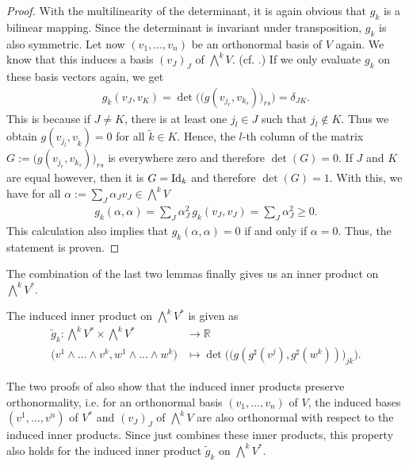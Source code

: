 \begin{proof}
	With the multilinearity of the determinant, it is again obvious that $g_k$ is a bilinear mapping.
	Since the determinant is invariant under transposition, $g_k$ is also symmetric. Let now 
	$(v_1,\dots,v_n)$ be an orthonormal basis of $V$ again. We know that this induces a basis 
	$(v_J)_J$ of $\bigwedge^k V$. (cf. \cite[Proposition 14.8]{Lee2012}.) If we only evaluate $g_k$ 
	on these basis vectors again, we get
	\begin{align*}
		g_k(v_J,v_K) = \det\Big(\big(g(v_{j_r}, v_{k_s})\big)_{rs}\Big) =
		\delta_{JK}.
	\end{align*}
	This is because if $J \neq K$, there is at least one $j_l \in J$ such that $j_l \not\in K$. Thus we
	obtain $g(v_{j_l}, v_{\tilde{k}}) = 0$ for all $\tilde{k} \in K$. Hence, the $l$-th column of the 
	matrix $G:=\big(g(v_{j_r},v_{k_s})\big)_{rs}$ is everywhere zero and therefore 
	$\det(G) = 0$.  If $J$ and $K$ are equal however, then it is $G = \operatorname{Id}_k$ and therefore 
	$\det(G) = 1$. With this, we have for all $\alpha := \sum_{J} \alpha_J v_J\in \bigwedge^k V$
	\begin{align*}
		g_k(\alpha,\alpha) = \sum_{J}  \alpha_J^2\, g_k(v_J,v_J) = \sum_{J} \alpha_J^2  \geq 0.
	\end{align*}
	This calculation also implies that $g_k(\alpha,\alpha) = 0$ if and only if $\alpha = 0$. Thus, the
	statement is proven.
\end{proof}
The combination of the last two lemmas finally gives us an inner product on
$\bigwedge\nolimits^kV^*$.
\begin{cor}
	\label{loc-theory:cor:induced-product-on-exterior-algebra}
	The induced inner product on $\bigwedge^kV^*$ is given as
	\begin{align*}
		\tilde{g}_k: \bigwedge^kV^* \times \bigwedge^kV^* &\rightarrow \mathbb{R}\\
		\big(v^1 \wedge \dots \wedge v^k, w^1\wedge\dots \wedge w^k\big) &\mapsto
		\det\Big(\big(g(g^\sharp(v^j),g^\sharp(w^k))\big)_{jk}\Big).
	\end{align*}
\end{cor}
\begin{rem}
	\label{loc-theory:rem:preserving-orthonormality}
	The two proofs of
	also show that the induced inner products preserve orthonormality, i.e. for an orthonormal basis 
	$(v_1,\dots,v_n)$ of $V$, the induced bases $(v^1,\dots,v^n)$ of $V^*$ and $(v_J)_{J}$ of 
	$\bigwedge^k V$ are also orthonormal with respect to the induced inner products. Since  just combines these inner products, 
	this property also holds for the induced inner product $\tilde{g}_k$ on $\bigwedge\nolimits^kV^*$.
\end{rem}


